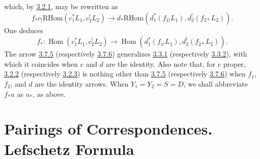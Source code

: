 \documentclass[11pt]{article}
\DeclareMathOperator{\Hom}{Hom}
\providecommand{\RHom}{\mathrm{RHom}}
\providecommand{\RHom}{\mathrm{RHom}}
\providecommand{\Hom}{\operatorname{Hom}}
\providecommand{\RHom}{\mathrm R\mathcal{H}om}
\providecommand{\RHom}{\mathrm{RHom}}
\providecommand{\Hom}{\operatorname{Hom}}
\begin{document}
which, by \hyperref[sga5:III:equation:3.2.1]{3.2.1}, may be rewritten as
\begin{equation}
f_*c_!\RHom(c_1^*L_1,c_2^!L_2)
\longrightarrow
 d_*\RHom(d_1^*(f_{1!}L_1),d_2^!(f_{2*}L_2)).
\tag{3.7.5}\label{sga5:III:equation:3.7.5}
\end{equation}
One deduces
\begin{equation}
f_*:\Hom(c_1^*L_1,c_2^!L_2)
\longrightarrow
\Hom(d_1^*(f_{1!}L_1),d_2^!(f_{2*}L_2)).
\tag{3.7.6}\label{sga5:III:equation:3.7.6}
\end{equation}
The arrow \hyperref[sga5:III:equation:3.7.5]{3.7.5} (respectively \hyperref[sga5:III:equation:3.7.6]{3.7.6}) generalizes \hyperref[sga5:III:equation:3.3.1]{3.3.1} (respectively \hyperref[sga5:III:equation:3.3.2]{3.3.2}), with which it coincides when $c$ and $d$ are the identity. Also note that, for $c$ proper, \hyperref[sga5:III:equation:3.2.2]{3.2.2} (respectively \hyperref[sga5:III:equation:3.2.3]{3.2.3}) is nothing other than \hyperref[sga5:III:equation:3.7.5]{3.7.5} (respectively \hyperref[sga5:III:equation:3.7.6]{3.7.6}) when $f_1$, $f_2$, and $d$ are the identity arrows. When $Y_1=Y_2=S=D$, we shall abbreviate $f_*u$ as $u_*$, as above.

\section{Pairings of Correspondences. Lefschetz Formula}
\end{document}
